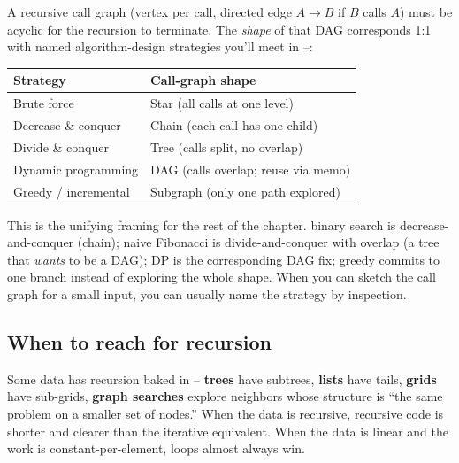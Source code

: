 \documentclass[11pt]{article}
\begin{document}
\begin{notebox}
A recursive call graph (vertex per call, directed edge $A \to B$ if
$B$ calls $A$) must be acyclic for the recursion to terminate. The
\emph{shape} of that DAG corresponds 1:1 with named algorithm-design
strategies you'll meet in --:

\begin{center}
\small
\begin{tabular}{ll}
\textbf{Strategy} & \textbf{Call-graph shape} \\
\hline
Brute force                & Star (all calls at one level) \\
Decrease \& conquer        & Chain (each call has one child) \\
Divide \& conquer          & Tree (calls split, no overlap) \\
Dynamic programming        & DAG (calls overlap; reuse via memo) \\
Greedy / incremental       & Subgraph (only one path explored) \\
\end{tabular}
\normalsize
\end{center}

This is the unifying framing for the rest of the chapter.
 binary search is decrease-and-conquer (chain);
naive Fibonacci is divide-and-conquer with overlap (a tree that
\emph{wants} to be a DAG);  DP is the corresponding
DAG fix;  greedy commits to one branch instead of
exploring the whole shape. When you can sketch the call graph for a
small input, you can usually name the strategy by inspection.
\end{notebox}

\subsection{When to reach for recursion}

\begin{ideabox}
Some data has recursion baked in -- \textbf{trees} have subtrees,
\textbf{lists} have tails, \textbf{grids} have sub-grids, \textbf{graph
searches} explore neighbors whose structure is ``the same problem on
a smaller set of nodes.'' When the data is recursive, recursive code
is shorter and clearer than the iterative equivalent. When the data
is linear and the work is constant-per-element, loops almost always
win.
\end{ideabox}
\end{document}
